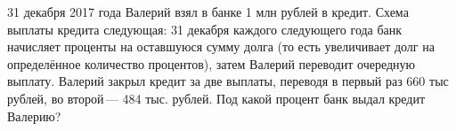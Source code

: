 \begin{ex}
	\begin{condition}
	31 декабря 2017 года Валерий взял в банке 1 млн рублей в кредит. Схема выплаты кредита следующая: 31 декабря каждого следующего года банк начисляет проценты на оставшуюся сумму долга (то есть увеличивает долг на определённое количество процентов), затем Валерий переводит очередную выплату. Валерий закрыл кредит за две выплаты, переводя в первый раз 660 тыс рублей, во второй — 484 тыс. рублей. Под какой процент банк выдал кредит Валерию?
	\end{condition}
\end{ex}